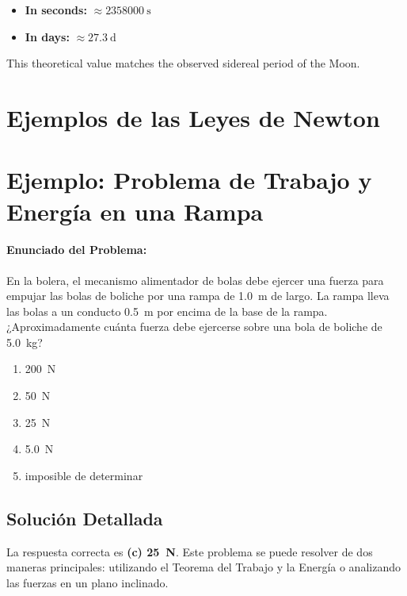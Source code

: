 \documentclass[11pt,a4paper]{book}
\begin{document}
\begin{itemize}
    \item \textbf{In seconds:} $\approx \SI{2358000}{\second}$
    \item \textbf{In days:} $\approx \SI{27.3}{\day}$
\end{itemize}

This theoretical value matches the observed sidereal period of the Moon.

\section{Ejemplos de las Leyes de Newton}


\section*{Ejemplo: Problema de Trabajo y Energía en una Rampa}

\paragraph{Enunciado del Problema:}
En la bolera, el mecanismo alimentador de bolas debe ejercer una fuerza para empujar las bolas de boliche por una rampa de \SI{1.0}{\meter} de largo. La rampa lleva las bolas a un conducto \SI{0.5}{\meter} por encima de la base de la rampa. ¿Aproximadamente cuánta fuerza debe ejercerse sobre una bola de boliche de \SI{5.0}{\kilo\gram}?

\begin{enumerate}[label=(\alph*)]
    \item \SI{200}{\newton}
    \item \SI{50}{\newton}
    \item \SI{25}{\newton}
    \item \SI{5.0}{\newton}
    \item imposible de determinar
\end{enumerate}

\subsection*{Solución Detallada}

La respuesta correcta es \textbf{(c) \SI{25}{\newton}}. Este problema se puede resolver de dos maneras principales: utilizando el Teorema del Trabajo y la Energía o analizando las fuerzas en un plano inclinado.
\end{document}
